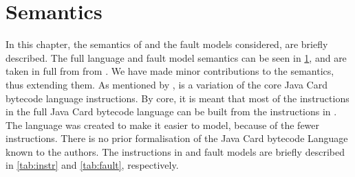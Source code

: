 \section{Semantics}\label{chap:semantics}
%
%
%
In this chapter, the semantics of \jcl and the fault models considered, are briefly described. The full language and fault model semantics can be seen in \cref{chap:semantics}, and are taken in full from from \cite{javasec}. We have made minor contributions to the semantics, thus extending them. As mentioned by \cite{javasec}, \jcl is a variation of the core Java Card bytecode language instructions. By core, it is meant that most of the instructions in the full  Java Card bytecode language can be built from the instructions in \jcl. The language was created to make it easier to model, because of the fewer instructions. There is no prior formalisation of the Java Card bytecode Language known to the authors. The instructions in \jcl and fault models are briefly described in \cref{tab:instr} and \cref{tab:fault}, respectively. 




